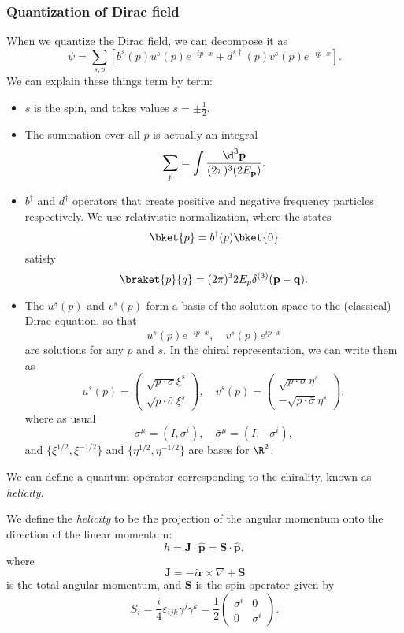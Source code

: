 \documentclass[a4paper]{article}
\begin{document}
\subsubsection*{Quantization of Dirac field}
When we quantize the Dirac field, we can decompose it as
\[
  \psi = \sum_{s, p}\left[b^s (p) u^s(p) e^{-ip\cdot x} + d^{s\dagger}(p) v^s(p) e^{-ip\cdot x}\right].
\]
We can explain these things term by term:
\begin{itemize}
  \item $s$ is the spin, and takes values $s = \pm \frac{1}{2}$.
  \item The summation over all $p$ is actually an integral
    \[
      \sum_p = \int \frac{\d^3 \mathbf{p}}{(2\pi)^3 (2E_\mathbf{p})}.
    \]
  \item $b^\dagger$ and $d^\dagger$ operators that create positive and negative frequency particles respectively. We use relativistic normalization, where the states
    \[
      \bket{p} = b^\dagger(p) \bket{0}
    \]
    satisfy
    \[
      \braket{p}{q} = (2\pi)^3 2E_p \delta^{(3)} (\mathbf{p} - \mathbf{q}).
    \]
  \item The $u^s(p)$ and $v^s(p)$ form a basis of the solution space to the (classical) Dirac equation, so that
    \[
      u^s(p) e^{-ip\cdot x},\quad v^s(p) e^{ip\cdot x}
    \]
    are solutions for any $p$ and $s$. In the chiral representation, we can write them as
    \[
      u^s(p) =
      \begin{pmatrix}
        \sqrt{p \cdot \sigma} \xi^s\\
        \sqrt{p \cdot \bar\sigma} \xi^s
      \end{pmatrix},\quad
      v^s(p) =
      \begin{pmatrix}
        \sqrt{p \cdot \sigma} \eta^s\\
        -\sqrt{p \cdot \bar\sigma} \eta^s
      \end{pmatrix},
    \]
    where as usual
    \[
      \sigma^\mu = (I, \sigma^i),\quad \bar{\sigma}^\mu = (I, - \sigma^i),
    \]
    and $\{\xi^{1/2}, \xi^{-1/2}\}$ and $\{\eta^{1/2}, \eta^{-1/2}\}$ are bases for $\R^2$.
\end{itemize}

We can define a quantum operator corresponding to the chirality, known as \emph{helicity}.
\begin{defi}[Helicity]
  We define the \emph{helicity} to be the projection of the angular momentum onto the direction of the linear momentum:
  \[
    h = \mathbf{J} \cdot \hat{\mathbf{p}} = \mathbf{S} \cdot \hat{\mathbf{p}},
  \]
  where
  \[
    \mathbf{J} = -i \mathbf{r} \times \nabla + \mathbf{S}
  \]
  is the total angular momentum, and $\mathbf{S}$ is the spin operator given by
  \[
    S_i = \frac{i}{4} \varepsilon_{ijk} \gamma^j \gamma^k = \frac{1}{2}
    \begin{pmatrix}
      \sigma^i & 0\\
      0 & \sigma^i
    \end{pmatrix}.
  \]
\end{defi}
\end{document}
